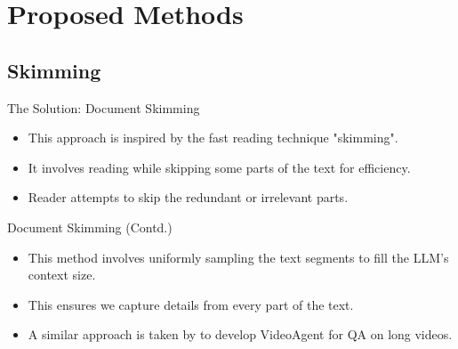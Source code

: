 \section{Proposed Methods}


\subsection{Skimming}

\begin{frame}{The Solution: Document Skimming}

\begin{itemize}
  \item This approach is inspired by the fast reading technique "skimming".
  \item<2-> It involves reading while skipping some parts of the text for efficiency.
  \item<3> Reader attempts to skip the redundant or irrelevant parts.
\end{itemize}



\end{frame}

\begin{frame}{Document Skimming (Contd.)}

\begin{itemize}
	\item This method involves uniformly sampling the text segments to fill the LLM's
	context size.
	\item<3-> This ensures we capture details from every part of the text.
	\item<4> A similar approach is taken by \citet{wang2024videoagent} to develop
	VideoAgent for QA on long videos.
\end{itemize}



\end{frame}


